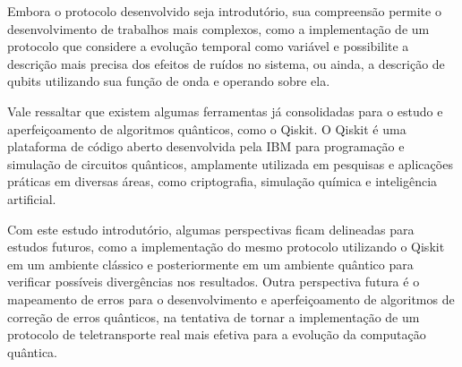 Embora o protocolo desenvolvido seja introdutório, sua compreensão permite o desenvolvimento de trabalhos mais complexos, como a implementação de um protocolo que considere a evolução temporal como variável e possibilite a descrição mais precisa dos efeitos de ruídos no sistema, ou ainda, a descrição de qubits utilizando sua função de onda e operando sobre ela.


Vale ressaltar que existem algumas ferramentas já consolidadas para o estudo e aperfeiçoamento de algoritmos quânticos, como o Qiskit. O Qiskit é uma plataforma de código aberto desenvolvida pela IBM para programação e simulação de circuitos quânticos, amplamente utilizada em pesquisas e aplicações práticas em diversas áreas, como criptografia, simulação química e inteligência artificial.

Com este estudo introdutório, algumas perspectivas ficam delineadas para estudos futuros, como a implementação do mesmo protocolo utilizando o Qiskit em um ambiente clássico e posteriormente em um ambiente quântico para verificar possíveis divergências nos resultados. Outra perspectiva futura é o mapeamento de erros para o desenvolvimento e aperfeiçoamento de algoritmos de correção de erros quânticos, na tentativa de tornar a implementação de um protocolo de teletransporte real mais efetiva para a evolução da computação quântica.
